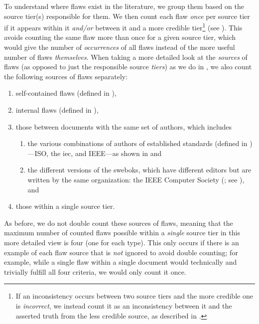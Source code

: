 \label{flaw-cred-compare}
To understand where flaws exist in the literature, we group them based on the
source tier(s) responsible for them. We then count each flaw \emph{once} per
source tier if it appears within it \emph{and/or} between it and a more
credible tier\footnote{If an inconsistency occurs between two source tiers
    and the more credible one is \emph{incorrect}, we instead count it as an
    inconsistency between it and the asserted truth from the less credible
    source, as described in .} (see ). This avoids counting the same flaw
more than once for a given source tier, which would give the
number of \emph{occurrences} of all flaws instead of the more useful number of
flaws \emph{themselves}. When taking a more detailed look at the \emph{sources}
of flaws (as opposed to just the responsible source \emph{tiers}) as we do in
, we also count the following sources of flaws separately:
\begin{enumerate}
    \item self-contained flaws (defined in ),
    \item internal flaws (defined in ),
    \item those between documents with the same set of authors, which includes
          \begin{enumerate}
              \item the various combinations of authors of established
                    standards (defined in )---ISO, the \acf{iec},
                    and IEEE---as shown in  and
              \item the different versions of the \acfp{swebok}, which have
                    different editors \citep{SWEBOK2024,SWEBOK2014} but are
                    written by the same organization: the IEEE Computer Society
                    (\citealp{AboutSWEBOK}; see ), and
          \end{enumerate}
    \item those within a single source tier.
\end{enumerate}
As before, we do not double count these sources of flaws, meaning that the
maximum number of counted flaws possible within a \emph{single} source tier in
this more detailed view is four (one for each type). This only occurs if there
is an example of each flaw source that is \emph{not} ignored to avoid double
counting; for example, while a single flaw within a single document would
technically and trivially fulfill all four criteria, we would only count it
once.

